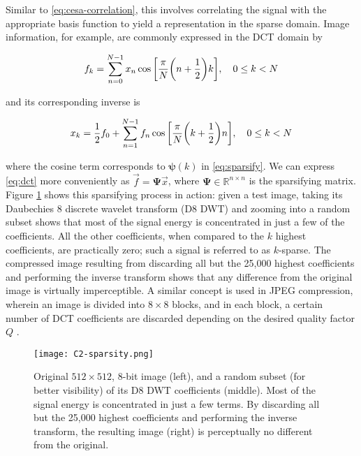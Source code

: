Similar to \eqref{eq:cesa-correlation}, this involves correlating the signal with the appropriate basis function to yield a representation in the sparse domain. Image information, for example, are commonly expressed in the DCT domain by

\begin{equation}\label{eq:dct}
	f_k = \sum_{n=0}^{N-1} x_n \cos\qty[\frac{\pi}{N}\qty(n + \frac{1}{2})k] , \quad 0 \leq k < N
\end{equation}

\noindent and its corresponding inverse is

\begin{equation}\label{eq:idct}
	x_k = \frac{1}{2}f_0 + \sum_{n=1}^{N-1} f_n \cos\qty[\frac{\pi}{N} \qty(k + \frac{1}{2})n] , \quad 0 \leq k < N
\end{equation}

\noindent where the cosine term corresponds to $\bm\psi(k)$ in \eqref{eq:sparsify}. We can express \eqref{eq:dct} more conveniently as $\vec{f} = \bm\Psi \vec{x}$, where $\bm\Psi \in \mathbb{R}^{n \times n}$ is the sparsifying matrix. Figure \ref{fig:sparsity} shows this sparsifying process in action: given a test image, taking its Daubechies 8 discrete wavelet transform (D8 DWT) and zooming into a random subset shows that most of the signal energy is concentrated in just a few of the coefficients. All the other coefficients, when compared to the $k$ highest coefficients, are practically zero; such a signal is referred to as $k$-sparse. The compressed image resulting from discarding all but the 25,000 highest coefficients and performing the inverse transform shows that any difference from the original image is virtually imperceptible. A similar concept is used in JPEG compression, wherein an image is divided into $8 \times 8$ blocks, and in each block, a certain number of DCT coefficients are discarded depending on the desired quality factor $Q$ \cite{itu-jpeg}.

\begin{figure}[tb]
	\texttt{[image: C2-sparsity.png]}
	\caption{Original $512 \times 512$, 8-bit image (left), and a random subset (for better visibility) of its D8 DWT coefficients (middle). Most of the signal energy is concentrated in just a few terms. By discarding all but the 25,000 highest coefficients and performing the inverse transform, the resulting image (right) is perceptually no different from the original.}
	\label{fig:sparsity}
\end{figure}


